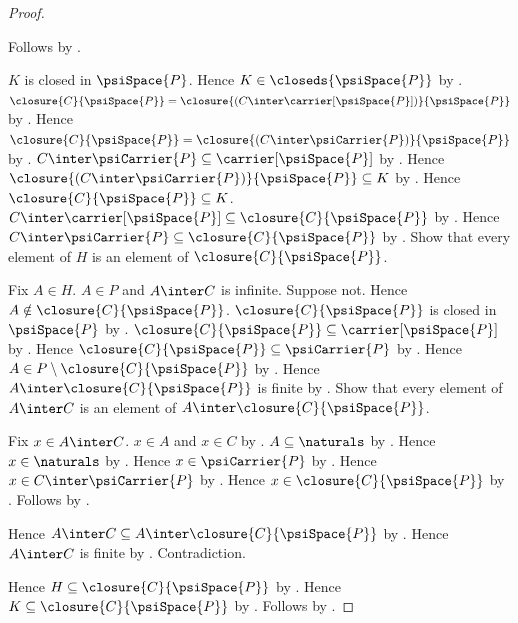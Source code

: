 \begin{proof}
\begin{subproof}
\begin{subproof}
        \end{subproof}
        Follows by .
    \end{subproof}
    $K$ is closed in $\psiSpace{P}$.
    Hence $K\in\closeds{\psiSpace{P}}$ by .
    $\closure{C}{\psiSpace{P}}=
        \closure{(C\inter\carrier[\psiSpace{P}])}{\psiSpace{P}}$
        by .
    Hence $\closure{C}{\psiSpace{P}}=
        \closure{(C\inter\psiCarrier{P})}{\psiSpace{P}}$
        by .
    $C\inter\psiCarrier{P}\subseteq\carrier[\psiSpace{P}]$
        by .
    Hence $\closure{(C\inter\psiCarrier{P})}{\psiSpace{P}}\subseteq K$
        by .
    Hence $\closure{C}{\psiSpace{P}}\subseteq K$.
    $C\inter\carrier[\psiSpace{P}]\subseteq
        \closure{C}{\psiSpace{P}}$
        by .
    Hence $C\inter\psiCarrier{P}\subseteq
        \closure{C}{\psiSpace{P}}$ by .
    Show that every element of $H$ is an element of
        $\closure{C}{\psiSpace{P}}$.
    \begin{subproof}
        Fix $A\in H$.
        $A\in P$ and $A\inter C$ is infinite.
        Suppose not.
        Hence $A\notin\closure{C}{\psiSpace{P}}$.
        $\closure{C}{\psiSpace{P}}$ is closed in $\psiSpace{P}$
            by .
        $\closure{C}{\psiSpace{P}}\subseteq\carrier[\psiSpace{P}]$
            by .
        Hence $\closure{C}{\psiSpace{P}}\subseteq\psiCarrier{P}$
            by .
        Hence $A\in P\setminus\closure{C}{\psiSpace{P}}$
            by .
        Hence $A\inter\closure{C}{\psiSpace{P}}$ is finite
            by .
        Show that every element of $A\inter C$ is an element of
            $A\inter\closure{C}{\psiSpace{P}}$.
        \begin{subproof}
            Fix $x\in A\inter C$.
            $x\in A$ and $x\in C$ by .
            $A\subseteq\naturals$ by
                .
            Hence $x\in\naturals$ by .
            Hence $x\in\psiCarrier{P}$ by
                .
            Hence $x\in C\inter\psiCarrier{P}$ by .
            Hence $x\in\closure{C}{\psiSpace{P}}$ by .
            Follows by .
        \end{subproof}
        Hence $A\inter C\subseteq
            A\inter\closure{C}{\psiSpace{P}}$ by .
        Hence $A\inter C$ is finite by .
        Contradiction.
    \end{subproof}
    Hence $H\subseteq\closure{C}{\psiSpace{P}}$ by .
    Hence $K\subseteq\closure{C}{\psiSpace{P}}$
        by .
    Follows by .
\end{proof}

